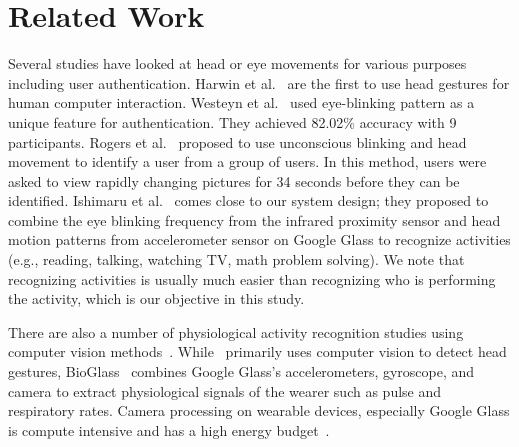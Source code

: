 \section{Related Work}\label{sec:related}


Several studies have looked at head or eye movements for various purposes including user authentication.  
Harwin et al.~\cite{harwin1990analysis} are the first to use head gestures for human computer interaction.
Westeyn et al.~\cite{westeyn2004recognizing} used
eye-blinking pattern as a unique feature for
authentication. They achieved 82.02\% accuracy with 9 participants. %
Rogers et al.~\cite{rogers2015approach} proposed to use unconscious blinking and head movement to identify a user from a group of users. In this method, users were asked to view rapidly changing pictures for 34 seconds before they can be identified.
Ishimaru et al.~\cite{ishimaru2014blink} comes close to our system
design; they proposed to combine the eye blinking frequency from the infrared
proximity sensor and head motion patterns from accelerometer sensor on Google
Glass to recognize activities (e.g., reading, talking, watching TV,
math problem solving). We note that recognizing activities is usually much easier than recognizing who is performing the activity, which is our objective in this study.

There are also a number of physiological activity recognition studies
using computer vision methods~\cite{kjeldsen2001head,hernandezbioglass}.
While~\cite{kjeldsen2001head} primarily uses computer vision to detect
head gestures, BioGlass~\cite{hernandezbioglass}
combines Google Glass's accelerometers, gyroscope, and camera to
extract physiological signals of the wearer such as pulse
and respiratory rates. Camera processing on wearable devices, especially
Google Glass is compute intensive and has a high energy
budget~\cite{likamwa2014draining}.

